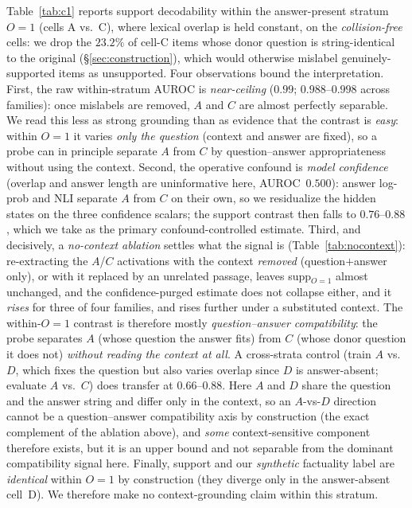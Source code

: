 Table~\ref{tab:c1} reports support decodability within the answer-present stratum
$O{=}1$ (cells A vs.\ C), where lexical overlap is held constant, on the
\emph{collision-free} cells: we drop the $23.2\%$ of cell-C items whose donor question
is string-identical to the original (\S\ref{sec:construction}), which would otherwise
mislabel genuinely-supported items as unsupported. Four observations bound the
interpretation. First, the raw within-stratum AUROC is \emph{near-ceiling}
($0.99$; $0.988$--$0.998$ across families): once mislabels are removed, $A$ and $C$ are
almost perfectly separable. We read this less as strong grounding than as evidence
that the contrast is \emph{easy}: within $O{=}1$ it varies \emph{only the question}
(context and answer are fixed), so a probe can in principle separate $A$ from $C$ by
question--answer appropriateness without using the context. Second, the operative
confound is \emph{model confidence} (overlap and answer length are uninformative here,
AUROC~$0.500$): answer log-prob and NLI separate $A$ from $C$ on their own, so we
residualize the hidden states on the three confidence scalars; the support contrast then
falls to $0.76$--$0.88$, which we take as the primary confound-controlled estimate.
Third, and decisively, a \emph{no-context ablation} settles what the signal is
(Table~\ref{tab:nocontext}): re-extracting the $A$/$C$ activations with the context
\emph{removed} (question$+$answer only), or with it replaced by an unrelated passage,
leaves supp$_{O=1}$ almost unchanged, and the confidence-purged estimate does not
collapse either, and it \emph{rises} for three of four families, and rises further under
a substituted context.
The within-$O{=}1$ contrast is therefore mostly \emph{question--answer compatibility}:
the probe separates $A$ (whose question the answer fits) from $C$ (whose donor question
it does not) \emph{without reading the context at all}. A cross-strata control (train
$A$ vs.\ $D$, which fixes the question but also varies overlap since $D$ is
answer-absent; evaluate $A$ vs.\ $C$) does transfer at $0.66$--$0.88$. Here $A$ and $D$
share the question and the answer string and differ only in the context, so an
$A$-vs-$D$ direction cannot be a question--answer compatibility axis by construction
(the exact complement of the ablation above), and \emph{some}
context-sensitive component therefore exists, but it is an upper bound and not separable from the
dominant compatibility signal here. Finally, support and our
\emph{synthetic} factuality label are \emph{identical} within $O{=}1$ by construction
(they diverge only in the answer-absent cell~D). We therefore make no context-grounding claim within this stratum.

